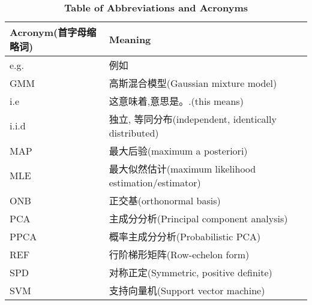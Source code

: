 \begin{table}
\caption*{\textbf{Table of Abbreviations and Acronyms}}
\begin{tabular}{llp{\textwidth}}
	\hline
	Acronym(首字母缩略词) & Meaning \\
	\hline
	\hline
	e.g. & 例如 \\
	GMM & 高斯混合模型(Gaussian mixture model) \\
	i.e & 这意味着,意思是。.(this means)\\
	i.i.d & 独立, 等同分布(independent, identically distributed) \\
	MAP & 最大后验(maximum a posteriori) \\
	MLE & 最大似然估计(maximum likelihood estimation/estimator) \\
	ONB & 正交基(orthonormal basis) \\
	PCA & 主成分分析(Principal component analysis) \\
	PPCA & 概率主成分分析(Probabilistic PCA) \\
	REF & 行阶梯形矩阵(Row-echelon form) \\
	SPD & 对称正定(Symmetric, positive definite) \\
	SVM & 支持向量机(Support vector machine) \\
	\hline
\end{tabular}
\end{table}

